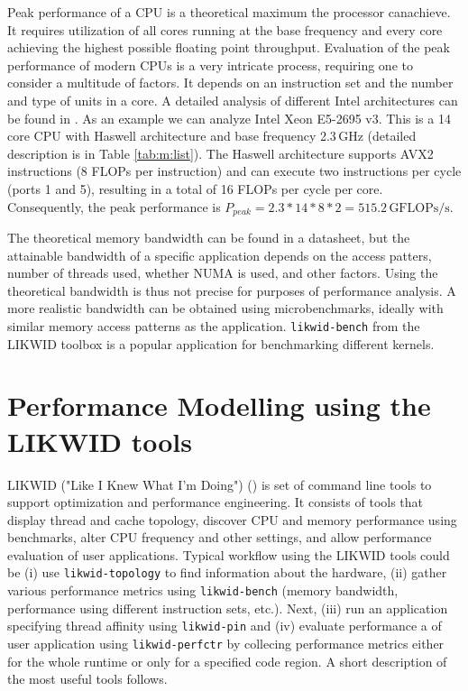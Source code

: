 Peak performance of a CPU is a theoretical maximum the processor can\linebreak achieve. It requires utilization of all cores running at the base frequency and every core achieving the highest possible floating point throughput.
Evaluation of the peak performance of modern CPUs is a very intricate process, requiring one to consider a multitude of factors. It depends on an instruction set and the number and type of units in a core. A detailed analysis of different Intel architectures can be found in \cite{dolbeau-2018}.
As an example we can analyze Intel Xeon E5-2695 v3. This is a 14 core CPU with Haswell architecture and base frequency 2.3\,GHz (detailed description is in Table \ref{tab:m:list}). The Haswell architecture supports AVX2 instructions (8 FLOPs per instruction) and can execute two instructions per cycle (ports 1 and 5), resulting in a total of 16 FLOPs per cycle per core.
Consequently, the peak performance is $P_{peak} = 2.3 * 14 * 8 * 2 = 515.2\,\textrm{GFLOPs/s}$.

The theoretical memory bandwidth can be found in a datasheet, but the attainable bandwidth of a specific application depends on the access patters, number of threads used, whether NUMA is used, and other factors. Using the theoretical bandwidth is thus not precise for purposes of performance analysis.
A more realistic bandwidth can be obtained using microbenchmarks, ideally with similar memory access patterns as the application. \texttt{likwid-bench} from the LIKWID toolbox is a popular application for benchmarking different kernels.

\section{Performance Modelling using the LIKWID tools}

LIKWID ("Like I Knew What I'm Doing") (\cite{likwid-2010-arxiv}) is set of command line tools to support optimization and performance engineering.
It consists of tools that display thread and cache topology, discover CPU and memory performance using benchmarks, alter CPU frequency and other settings, and allow performance evaluation of user applications.
Typical workflow using the LIKWID tools could be (i) use \texttt{likwid-topology} to find information about the hardware, (ii) gather various performance metrics using \texttt{likwid-bench} (memory bandwidth, performance using different instruction sets, etc.). Next, (iii) run an application specifying thread affinity using \texttt{likwid-pin} and (iv) evaluate performance a of user application using \texttt{likwid-perfctr} by collecing performance metrics either for the whole runtime or only for a specified code region.
A short description of the most useful tools follows.

